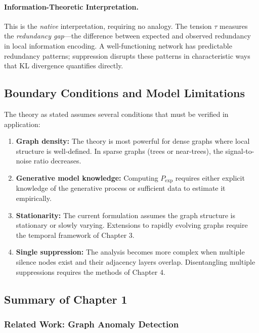 \documentclass[12pt,a4paper]{article}
\theoremstyle{definition}
\theoremstyle{remark}
\begin{document}
\paragraph{Information-Theoretic Interpretation.}
This is the \emph{native} interpretation, requiring no analogy. The tension $\tau$ measures the \emph{redundancy gap}---the difference between expected and observed redundancy in local information encoding. A well-functioning network has predictable redundancy patterns; suppression disrupts these patterns in characteristic ways that KL divergence quantifies directly.

\subsection{Boundary Conditions and Model Limitations}

The theory as stated assumes several conditions that must be verified in application:

\begin{enumerate}
    \item \textbf{Graph density:} The theory is most powerful for dense graphs where local structure is well-defined. In sparse graphs (trees or near-trees), the signal-to-noise ratio decreases.
    
    \item \textbf{Generative model knowledge:} Computing $P_{\text{exp}}$ requires either explicit knowledge of the generative process or sufficient data to estimate it empirically.
    
    \item \textbf{Stationarity:} The current formulation assumes the graph structure is stationary or slowly varying. Extensions to rapidly evolving graphs require the temporal framework of Chapter 3.
    
    \item \textbf{Single suppression:} The analysis becomes more complex when multiple silence nodes exist and their adjacency layers overlap. Disentangling multiple suppressions requires the methods of Chapter 4.
\end{enumerate}

\subsection{Summary of Chapter 1}

\subsubsection{Related Work: Graph Anomaly Detection}
\label{sec:related-work}
\end{document}
